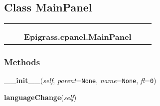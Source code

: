 \subsection{Class MainPanel}

    \label{Epigrass:cpanel:MainPanel}
\begin{tabular}{cccccc}
\multicolumn{2}{r}{\settowidth{\BCL}{??-5}\multirow{2}{\BCL}{??-5}}
&&
  \\\cline{3-3}
  &&\multicolumn{1}{c|}{}
&&
  \\
&&\multicolumn{2}{l}{\textbf{Epigrass.cpanel.MainPanel}}
\end{tabular}



  \subsubsection{Methods}

    \label{Epigrass:cpanel:MainPanel:__init__}

    \vspace{0.5ex}

    \begin{boxedminipage}{\textwidth}

    \raggedright \textbf{\_\_init\_\_}(\textit{self}, \textit{parent}=\texttt{None}, \textit{name}=\texttt{None}, \textit{fl}=\texttt{0})

    \end{boxedminipage}

    \label{Epigrass:cpanel:MainPanel:languageChange}

    \vspace{0.5ex}

    \begin{boxedminipage}{\textwidth}

    \raggedright \textbf{languageChange}(\textit{self})

    \end{boxedminipage}

